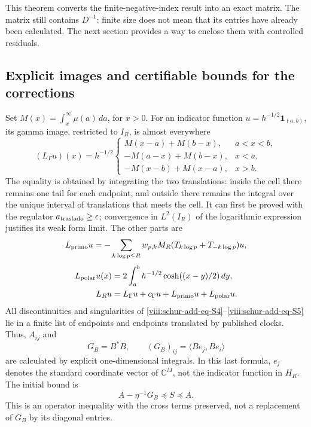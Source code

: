 This theorem converts the finite-negative-index result into an exact matrix. The matrix still contains \(D^{-1}\): finite size does not
mean that its entries have already been calculated. The next section
provides a way to enclose them with controlled residuals.

\subsection{Explicit images and certifiable bounds for the corrections}
\label{viii:schur-add-sub-148}

Set \(M(x)=\int_x^\infty\mu(a)\,da\), for \(x>0\).
For an indicator function \(u=h^{-1/2}\mathbf1_{(a,b)}\), its gamma image,
restricted to \(I_R\), is almost everywhere
\begin{equation}
(L_\Gamma u)(x)=h^{-1/2}
\begin{cases}
M(x-a)+M(b-x),&a<x<b,\\
-M(a-x)+M(b-x),&x<a,\\
-M(x-b)+M(x-a),&x>b.
\end{cases}
\label{viii:schur-add-eq-S4}
\end{equation}
The equality is obtained by integrating the two translations: inside the
cell there remains one tail for each endpoint, and outside there remains the integral over the
unique interval of translations that meets the cell. It can first be proved
with the regulator \(a_{\rm traslado}\geq\epsilon\); convergence in
\(L^2(I_R)\) of the logarithmic expression justifies its weak form
limit. The other parts are
\begin{equation}
L_{\rm primo}u=-\sum_{k\log p\leq R}w_{p,k}
M_R(T_{k\log p}+T_{-k\log p})u,
\label{viii:schur-add-display-11}
\end{equation}
\begin{equation}
\begin{aligned}
L_{\rm polar}u(x)&=2\int_a^b h^{-1/2}\cosh((x-y)/2)\,dy,\\
L_Ru&=L_\Gamma u+c_\Gamma u+L_{\rm primo}u+L_{\rm polar}u.
\end{aligned}
\label{viii:schur-add-eq-S5}
\end{equation}
All discontinuities and singularities of \eqref{viii:schur-add-eq-S4}--\eqref{viii:schur-add-eq-S5} lie in a
finite list of endpoints and endpoints translated by published clocks.
Thus, \(A_{ij}\) and
\begin{equation}
G_B=B^*B,\qquad (G_B)_{ij}=\langle Be_j,Be_i\rangle
\label{viii:schur-add-display-13}
\end{equation}
are calculated by explicit one-dimensional integrals. In this last
formula, \(e_j\) denotes the standard coordinate vector of
\(\mathbb C^M\), not the indicator function in \(H_R\).
The initial bound is
\begin{equation}
A-\eta^{-1}G_B\preceq S\preceq A.
\label{viii:schur-add-eq-S6}
\end{equation}
This is an operator inequality with the cross terms preserved, not a
replacement of \(G_B\) by its diagonal entries.

